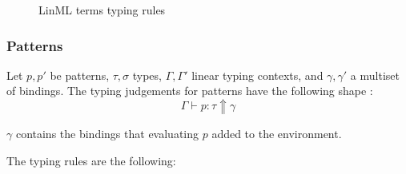 \documentclass{article}
\begin{document}
\begin{figure}[H]

    \caption{LinML terms typing rules}
    \label{termtyprules}
\end{figure}

\subsubsection{Patterns}


Let $p, p'$ be patterns, $\tau, \sigma$ types, $\Gamma, \Gamma'$ linear typing contexts, and $\gamma, \gamma'$ a multiset of bindings. The typing judgements for patterns have the following shape :
$$
\Gamma \vdash p : \tau \Uparrow \gamma
$$

$\gamma$ contains the bindings that evaluating $p$ added to the environment. \vspace{\baselineskip}

The typing rules are the following:
\end{document}
